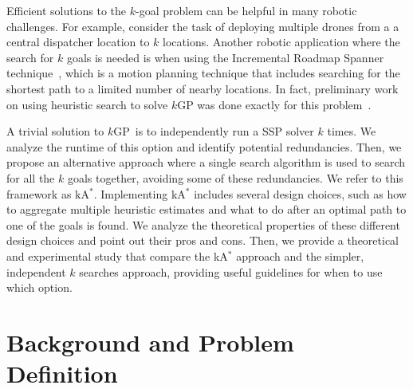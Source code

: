 \documentclass{aicom2e}
\newcommand{\kgs}{$k$GP}
\newcommand{\kastar}{kA$^*$}
\newcommand{\roni}[1]{\textbf{[RS:#1]}}
\begin{document}
Efficient solutions to the $k$-goal problem can be helpful in many robotic
challenges. For example, consider the task of deploying multiple drones from a
a central dispatcher location to $k$ locations. Another robotic application
where the search for $k$ goals is needed is when using the Incremental Roadmap
Spanner technique~\cite{marble2013asymptotically}, which is a motion planning
technique that includes searching for the shortest path to a limited number of
nearby locations. In fact, preliminary work on using heuristic search to solve
\kgs{} was done exactly for this problem~\cite{DobsonB14}. 

A trivial solution to \kgs\ is to independently run a SSP solver $k$ times. We
analyze the runtime of this option and identify potential redundancies. Then,
we propose an alternative approach where a single search algorithm is used to
search for all the $k$ goals together, avoiding some of these redundancies. We refer
to this framework as \kastar{}. Implementing \kastar{} includes several design
choices, such as how to aggregate multiple heuristic estimates and what to do
after an optimal path to one of the goals is found. We analyze the theoretical
properties of these different design choices and point out their pros and cons.
Then, we provide a theoretical and experimental study that compare the
\kastar{} approach and the simpler, independent $k$ searches approach,
providing useful guidelines for when to use which option.


\section{Background and Problem Definition}

\end{document}
